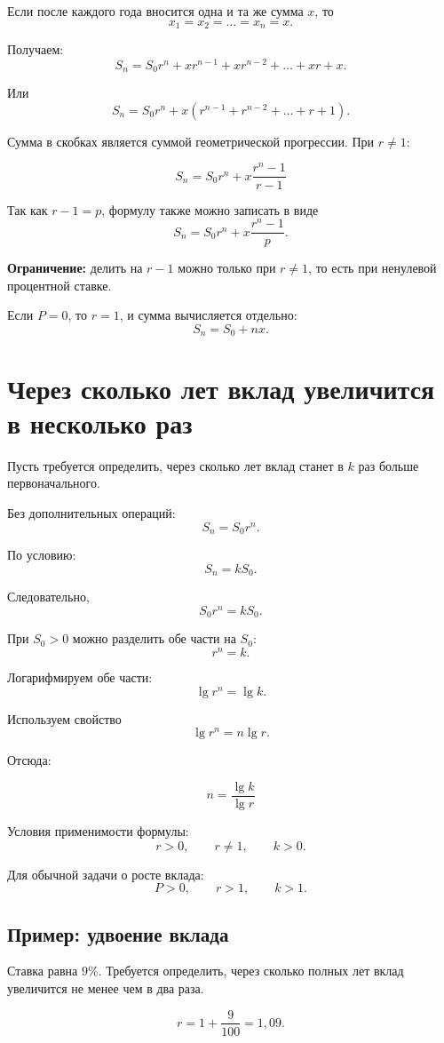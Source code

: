 \documentclass[a4paper,12pt]{article}
\newcommand{\warningtext}[1]{\textbf{\color{warning}#1}}
\newcommand{\formula}[1]{%
  \[
    \boxed{\displaystyle #1}
  \]
}
\begin{document}
Если после каждого года вносится одна и та же сумма \(x\), то
\[
x_1=x_2=\ldots=x_n=x.
\]

Получаем:
\[
S_n
=
S_0r^n
+xr^{n-1}
+xr^{n-2}
+\ldots
+xr+x.
\]

Или
\[
S_n
=
S_0r^n+x\left(r^{n-1}+r^{n-2}+\ldots+r+1\right).
\]

Сумма в скобках является суммой геометрической прогрессии. При \(r\ne1\):

\formula{
S_n=S_0r^n+x\frac{r^n-1}{r-1}
}

Так как \(r-1=p\), формулу также можно записать в виде
\[
S_n=S_0r^n+x\frac{r^n-1}{p}.
\]

\warningtext{Ограничение:} делить на \(r-1\) можно только при \(r\ne1\),
то есть при ненулевой процентной ставке.

Если \(P=0\), то \(r=1\), и сумма вычисляется отдельно:
\[
S_n=S_0+nx.
\]

\section{Через сколько лет вклад увеличится в несколько раз}

Пусть требуется определить, через сколько лет вклад станет в \(k\) раз больше
первоначального.

Без дополнительных операций:
\[
S_n=S_0r^n.
\]

По условию:
\[
S_n=kS_0.
\]

Следовательно,
\[
S_0r^n=kS_0.
\]

При \(S_0>0\) можно разделить обе части на \(S_0\):
\[
r^n=k.
\]

Логарифмируем обе части:
\[
\lg r^n=\lg k.
\]

Используем свойство
\[
\lg r^n=n\lg r.
\]

Отсюда:

\formula{n=\frac{\lg k}{\lg r}}

Условия применимости формулы:
\[
r>0,\qquad r\ne1,\qquad k>0.
\]

Для обычной задачи о росте вклада:
\[
P>0,\qquad r>1,\qquad k>1.
\]

\subsection{Пример: удвоение вклада}

Ставка равна \(9\%\). Требуется определить, через сколько полных лет вклад
увеличится не менее чем в два раза.

\[
r=1+\frac{9}{100}=1{,}09.
\]
\end{document}
